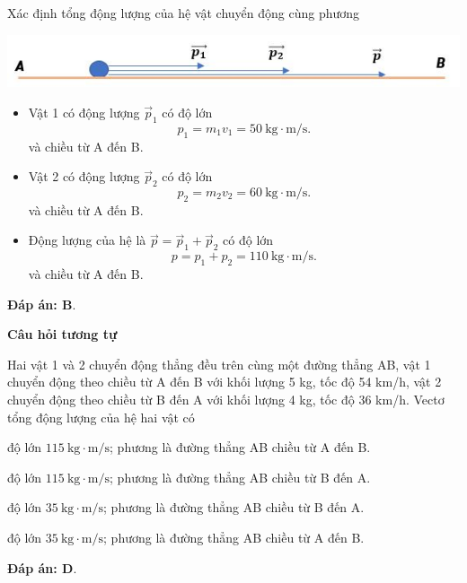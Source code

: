 \begin{dang}{Xác định tổng động lượng của hệ vật chuyển động cùng phương}
{		\begin{center}
			\includegraphics[scale=0.6]{../figs/VN10-PH-29-L-021-2-5.JPG}
		\end{center}
		\begin{itemize}
			\item Vật 1 có động lượng $\vec{p}_1$ có độ lớn 
			\begin{equation*}
				p_1=m_1v_1 =50 \ \text{kg} \cdot \text{m/s}. 
			\end{equation*} 
			và chiều từ A đến B.
			\item Vật 2 có động lượng $\vec{p}_2$ có độ lớn 
			\begin{equation*}
				p_2=m_2v_2 =60 \ \text{kg} \cdot \text{m/s}. 
			\end{equation*}
			và chiều từ A đến B.
			\item Động lượng của hệ là $\vec{p}=\vec{p}_1+\vec{p}_2$ có độ lớn 
			\begin{equation*}
				p=p_1+p_2 =110\ \text{kg} \cdot \text{m/s}. 
			\end{equation*}
			và chiều từ A đến B.
		\end{itemize}
		
		\textbf{Đáp án: B}.
		
		\begin{center}
			\textbf{Câu hỏi tương tự}
		\end{center}
		
		Hai vật 1 và 2 chuyển động thẳng đều trên cùng một đường thẳng AB, vật 1 chuyển động theo chiều từ A đến B với khối lượng 5 kg, tốc độ 54 km/h, vật 2 chuyển động theo chiều từ B đến A với khối lượng 4 kg, tốc độ 36 km/h. Vectơ tổng động lượng của hệ hai vật có
		\begin{mcq}
			\item độ lớn $115\ \text{kg} \cdot \text{m/s}$; phương là đường thẳng AB chiều từ A đến B.
			\item độ lớn $115\ \text{kg} \cdot \text{m/s}$; phương là đường thẳng AB chiều từ B đến A. 
			\item độ lớn $35\ \text{kg} \cdot \text{m/s}$; phương là đường thẳng AB chiều từ B đến A.
			\item độ lớn $35\ \text{kg} \cdot \text{m/s}$; phương là đường thẳng AB chiều từ A đến B.
		\end{mcq}
		
		\textbf{Đáp án: D}.
	}
\end{dang}

